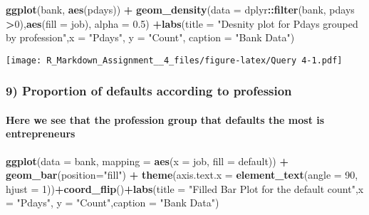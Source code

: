 \documentclass[]{article}
\newenvironment{Shaded}{\begin{snugshade}}{\end{snugshade}}
\newcommand{\KeywordTok}[1]{\textcolor[rgb]{0.13,0.29,0.53}{\textbf{#1}}}
\newcommand{\DataTypeTok}[1]{\textcolor[rgb]{0.13,0.29,0.53}{#1}}
\newcommand{\DecValTok}[1]{\textcolor[rgb]{0.00,0.00,0.81}{#1}}
\newcommand{\FloatTok}[1]{\textcolor[rgb]{0.00,0.00,0.81}{#1}}
\newcommand{\StringTok}[1]{\textcolor[rgb]{0.31,0.60,0.02}{#1}}
\newcommand{\OperatorTok}[1]{\textcolor[rgb]{0.81,0.36,0.00}{\textbf{#1}}}
\newcommand{\NormalTok}[1]{#1}
\let\oldparagraph\paragraph
\renewcommand{\paragraph}[1]{\oldparagraph{#1}\mbox{}}
\begin{document}
\begin{Shaded}
\begin{Highlighting}[]
\KeywordTok{ggplot}\NormalTok{(bank, }\KeywordTok{aes}\NormalTok{(pdays)) }\OperatorTok{+}
\KeywordTok{geom_density}\NormalTok{(}\DataTypeTok{data =}\NormalTok{ dplyr}\OperatorTok{::}\KeywordTok{filter}\NormalTok{(bank, pdays }\OperatorTok{>}\DecValTok{0}\NormalTok{),}\KeywordTok{aes}\NormalTok{(}\DataTypeTok{fill =}\NormalTok{ job), }\DataTypeTok{alpha =} \FloatTok{0.5}\NormalTok{) }\OperatorTok{+}\KeywordTok{labs}\NormalTok{(}\DataTypeTok{title =} \StringTok{"Desnity plot for Pdays grouped by profession"}\NormalTok{,}\DataTypeTok{x =} \StringTok{"Pdays"}\NormalTok{, }\DataTypeTok{y =} \StringTok{"Count"}\NormalTok{,}
\DataTypeTok{caption =} \StringTok{"Bank Data"}\NormalTok{) }
\end{Highlighting}
\end{Shaded}

\texttt{[image: R\_Markdown\_Assignment\_\_4\_files/figure-latex/Query 4-1.pdf]}

\subsubsection{9) Proportion of defaults according to
profession}\label{proportion-of-defaults-according-to-profession}

\paragraph{Here we see that the profession group that defaults the most
is
entrepreneurs}\label{here-we-see-that-the-profession-group-that-defaults-the-most-is-entrepreneurs}

\begin{Shaded}
\begin{Highlighting}[]
\KeywordTok{ggplot}\NormalTok{(}\DataTypeTok{data =}\NormalTok{ bank, }\DataTypeTok{mapping =} \KeywordTok{aes}\NormalTok{(}\DataTypeTok{x =}\NormalTok{ job, }\DataTypeTok{fill =}\NormalTok{ default)) }\OperatorTok{+}
\KeywordTok{geom_bar}\NormalTok{(}\DataTypeTok{position=}\StringTok{"fill"}\NormalTok{)  }\OperatorTok{+}
\KeywordTok{theme}\NormalTok{(}\DataTypeTok{axis.text.x =} \KeywordTok{element_text}\NormalTok{(}\DataTypeTok{angle =} \DecValTok{90}\NormalTok{, }\DataTypeTok{hjust =} \DecValTok{1}\NormalTok{))}\OperatorTok{+}\KeywordTok{coord_flip}\NormalTok{()}\OperatorTok{+}\KeywordTok{labs}\NormalTok{(}\DataTypeTok{title =} \StringTok{"Filled Bar Plot for the default count"}\NormalTok{,}\DataTypeTok{x =} \StringTok{"Pdays"}\NormalTok{, }\DataTypeTok{y =} \StringTok{"Count"}\NormalTok{,}\DataTypeTok{caption =} \StringTok{"Bank Data"}\NormalTok{) }
\end{Highlighting}
\end{Shaded}
\end{document}
